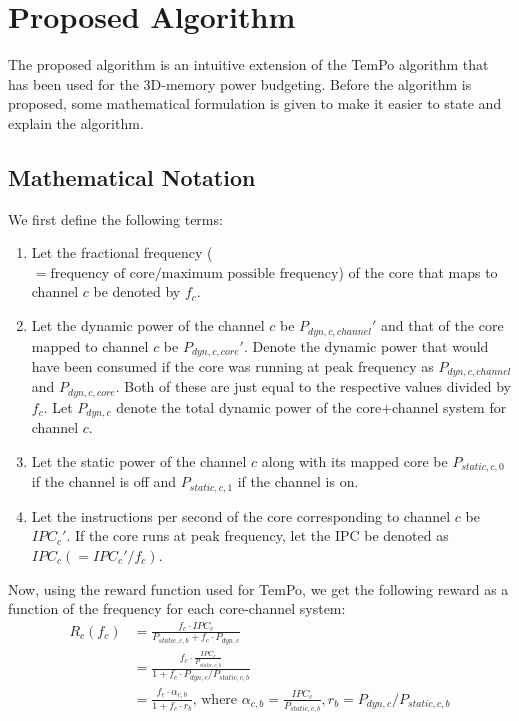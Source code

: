 \documentclass[11pt]{article}
\begin{document}
\section{Proposed Algorithm}
The proposed algorithm is an intuitive extension of the TemPo algorithm that has been used for the 3D-memory power budgeting. Before the algorithm is proposed, some mathematical formulation is given to make it easier to state and explain the algorithm.

\subsection{Mathematical Notation}
We first define the following terms:
\begin{enumerate}
    \item Let the fractional frequency ($=\text{frequency of core}/\text{maximum possible frequency}$) of the core that maps to channel $c$ be denoted by $f_c$.
    \item Let the dynamic power of the channel $c$ be $P_{dyn,c,channel}'$ and that of the core mapped to channel $c$ be $P_{dyn,c,core}'$. Denote the dynamic power that would have been consumed if the core was running at peak frequency as $P_{dyn,c,channel}$ and $P_{dyn,c,core}$. Both of these are just equal to the respective values divided by $f_c$. Let $P_{dyn,c}$ denote the total dynamic power of the core+channel system for channel $c$.
    \item Let the static power of the channel $c$ along with its mapped core be $P_{static,c,0}$ if the channel is off and $P_{static,c,1}$ if the channel is on.
    \item Let the instructions per second of the core corresponding to channel $c$ be $IPC_c'$. If the core runs at peak frequency, let the IPC be denoted as $IPC_c (= IPC_c'/f_c)$.
\end{enumerate}
Now, using the reward function used for TemPo, we get the following reward as a function of the frequency for each core-channel system:
\begin{equation}
    \begin{split}
        R_c(f_c) &= \frac{f_c\cdot IPC_c}{P_{static,c,b} + f_c\cdot P_{dyn,c}}\\
        &=\frac{f_c\cdot \frac{IPC_c}{P_{static,c,b}}}{1 + f_c\cdot P_{dyn,c}/P_{static,c,b}}\\
        &= \frac{f_c\cdot \alpha_{c,b}}{1 + f_c\cdot r_b}\text{, where }\alpha_{c,b} = \frac{IPC_c}{P_{static,c,b}}, r_b = P_{dyn,c}/P_{static,c,b}
    \end{split}
\end{equation}
\end{document}
